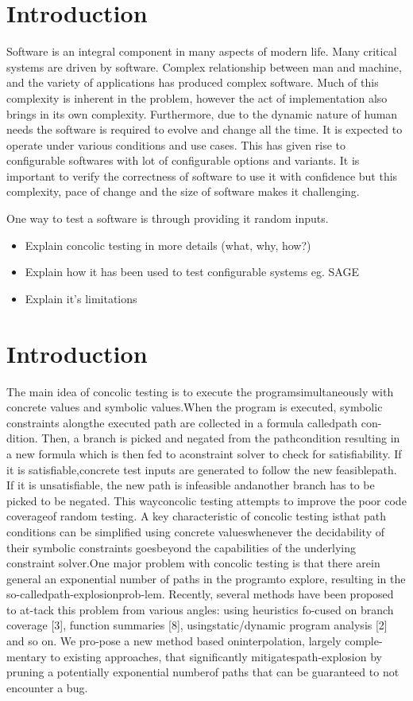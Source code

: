 \documentclass[	runningheads,
				a4paper]{llncs}
\begin{document}
\section{Introduction}
Software is an integral component in many aspects of modern life. Many critical systems are driven by software. Complex relationship between man and machine, and the variety of applications has produced complex software. Much of this complexity is inherent in the problem, however the act of implementation also brings in its own complexity. Furthermore, due to the dynamic nature of human needs the software is required to evolve and change all the time. It is expected to operate under various conditions and use cases. This has given rise to configurable softwares with lot of configurable options and variants. It is important to verify the correctness of software to use it with confidence but this complexity, pace of change and the size of software makes it challenging. 

One way to test a software is through providing it random inputs. 

\begin{itemize}
	\item Explain concolic testing in more details (what, why, how?)
	\item Explain how it has been used to test configurable systems eg. SAGE 
	\item Explain it's limitations 
\end{itemize}

\section{Introduction}
The main idea of concolic testing is to execute the programsimultaneously  with  concrete  values  and  symbolic  values.When the program is executed, symbolic constraints alongthe executed path are collected in a formula calledpath con-dition.  Then, a branch is picked and negated from the pathcondition resulting in a new formula which is then fed to aconstraint solver to check for satisfiability.  If it is satisfiable,concrete test inputs are generated to follow the new feasiblepath.   If  it  is  unsatisfiable,  the  new  path  is  infeasible  andanother branch has to be picked to be negated.  This wayconcolic testing attempts to improve the poor code coverageof random testing.  A key characteristic of concolic testing isthat path conditions can be simplified using concrete valueswhenever the decidability of their symbolic constraints goesbeyond the capabilities of the underlying constraint solver.One major problem with concolic testing is that there arein general an exponential number of paths in the programto  explore,  resulting  in  the  so-calledpath-explosionprob-lem.  Recently, several methods have been proposed to at-tack this problem from various angles:  using heuristics fo-cused on branch coverage [3], function summaries [8], usingstatic/dynamic  program  analysis  [2]  and  so  on.   We  pro-pose a new method based oninterpolation, largely comple-mentary to existing approaches, that significantly mitigatespath-explosion by pruning a potentially exponential numberof paths that can be guaranteed to not encounter a bug.
\end{document}
